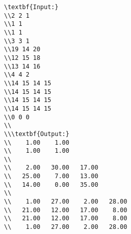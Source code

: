 \begin{verbatim}
\textbf{Input:}
\\2 2 1
\\1 1
\\1 1
\\3 3 1
\\19 14 20
\\12 15 18
\\13 14 16
\\4 4 2
\\14 15 14 15
\\14 15 14 15
\\14 15 14 15
\\14 15 14 15
\\0 0 0
\\
\\\textbf{Output:}
\\    1.00    1.00 
\\    1.00    1.00
\\
\\    2.00   30.00   17.00
\\   25.00    7.00   13.00
\\   14.00    0.00   35.00
\\
\\    1.00   27.00    2.00   28.00
\\   21.00   12.00   17.00    8.00
\\   21.00   12.00   17.00    8.00
\\    1.00   27.00    2.00   28.00\end{verbatim}